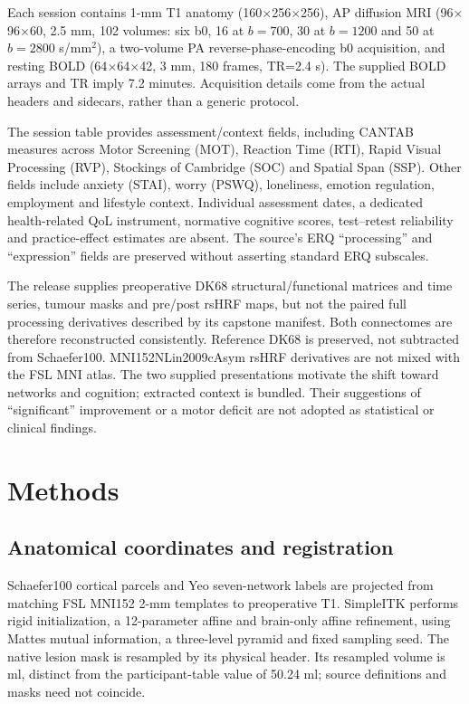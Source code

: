 \documentclass[11pt,a4paper]{article}
\begin{document}
Each session contains 1-mm T1 anatomy (160$\times$256$\times$256), AP diffusion MRI (96$\times$96$\times$60, 2.5 mm, 102 volumes: six b0, 16 at $b=700$, 30 at $b=1200$ and 50 at $b=2800$ s/mm$^2$), a two-volume PA reverse-phase-encoding b0 acquisition, and resting BOLD (64$\times$64$\times$42, 3 mm, 180 frames, TR=2.4 s). The supplied BOLD arrays and TR imply 7.2 minutes. Acquisition details come from the actual headers and sidecars, rather than a generic protocol.

The session table provides \AssessmentCount{} assessment/context fields, including \CantabCount{} CANTAB measures across Motor Screening (MOT), Reaction Time (RTI), Rapid Visual Processing (RVP), Stockings of Cambridge (SOC) and Spatial Span (SSP). Other fields include anxiety (STAI), worry (PSWQ), loneliness, emotion regulation, employment and lifestyle context. Individual assessment dates, a dedicated health-related QoL instrument, normative cognitive scores, test--retest reliability and practice-effect estimates are absent. The source's ERQ ``processing'' and ``expression'' fields are preserved without asserting standard ERQ subscales.

The release supplies preoperative DK68 structural/functional matrices and time series, tumour masks and pre/post rsHRF maps, but not the paired full processing derivatives described by its capstone manifest. Both connectomes are therefore reconstructed consistently. Reference DK68 is preserved, not subtracted from Schaefer100. MNI152NLin2009cAsym rsHRF derivatives are not mixed with the FSL MNI atlas. The two supplied presentations motivate the shift toward networks and cognition; extracted context is bundled. Their suggestions of ``significant'' improvement or a motor deficit are not adopted as statistical or clinical findings.

\section{Methods}
\subsection{Anatomical coordinates and registration}
Schaefer100 cortical parcels and Yeo seven-network labels \citep{schaefer2018,yeo2011} are projected from matching FSL MNI152 2-mm templates to preoperative T1. SimpleITK \citep{lowekamp2013} performs rigid initialization, a 12-parameter affine and brain-only affine refinement, using Mattes mutual information, a three-level pyramid and fixed sampling seed. The native lesion mask is resampled by its physical header. Its resampled volume is \LesionVolume{} ml, distinct from the participant-table value of 50.24 ml; source definitions and masks need not coincide.
\end{document}
